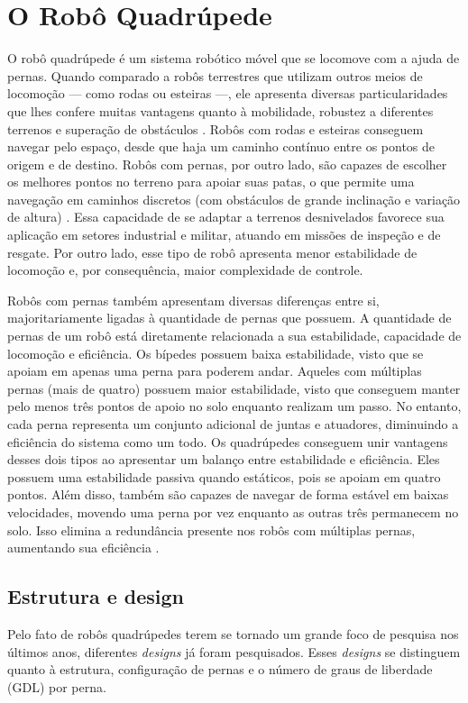 \documentclass[conference]{IEEEtran}
\begin{document}
\section{O Robô Quadrúpede}

O robô quadrúpede é um sistema robótico móvel que se locomove com a ajuda de pernas. Quando comparado a robôs terrestres que utilizam outros meios de locomoção --- como rodas ou esteiras ---, ele apresenta diversas particularidades que lhes confere muitas vantagens quanto à mobilidade, robustez a diferentes terrenos e superação de obstáculos \cite{Biswal2021}. Robôs com rodas e esteiras conseguem navegar pelo espaço, desde que haja um caminho contínuo entre os pontos de origem e de destino. Robôs com pernas, por outro lado, são capazes de escolher os melhores pontos no terreno para apoiar suas patas, o que permite uma navegação em caminhos discretos (com obstáculos de grande inclinação e variação de altura) \cite{Yao2021}. Essa capacidade de se adaptar a terrenos desnivelados favorece sua aplicação em setores  industrial e militar, atuando em missões de inspeção e de resgate. Por outro lado, esse tipo de robô apresenta menor estabilidade de locomoção e, por consequência, maior complexidade de controle.

Robôs com pernas também apresentam diversas diferenças entre si, majoritariamente ligadas à quantidade de pernas que possuem. A quantidade de pernas de um robô está diretamente relacionada a sua estabilidade, capacidade de locomoção e eficiência. Os bípedes possuem baixa estabilidade, visto que se apoiam em apenas uma perna para poderem andar. Aqueles com múltiplas pernas (mais de quatro) possuem maior estabilidade, visto que conseguem manter pelo menos três pontos de apoio no solo enquanto realizam um passo. No entanto, cada perna representa um conjunto adicional de juntas e atuadores, diminuindo a eficiência do sistema como um todo. Os quadrúpedes conseguem unir vantagens desses dois tipos ao apresentar um balanço entre estabilidade e eficiência. Eles possuem uma estabilidade passiva quando estáticos, pois se apoiam em quatro pontos. Além disso, também são capazes de navegar de forma estável em baixas velocidades, movendo uma perna por vez enquanto as outras três permanecem no solo. Isso elimina a redundância presente nos robôs com múltiplas pernas, aumentando sua eficiência \cite{Yao2021}.

\subsection{Estrutura e design}
Pelo fato de robôs quadrúpedes terem se tornado um grande foco de pesquisa nos últimos anos, diferentes \textit{designs} já foram pesquisados. Esses \textit{designs} se distinguem quanto à estrutura, configuração de pernas e o número de graus de liberdade (GDL) por perna.
\end{document}
